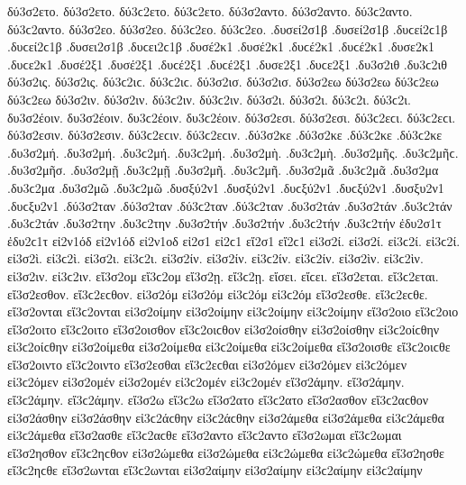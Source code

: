 {δύ3σ2ετο. δύ3σ2ετο. δύ3ϲ2ετο. δύ3ϲ2ετο.   %
δύ3σ2αντο. δύ3σ2αντο. δύ3ϲ2αντο. δύ3ϲ2αντο.   %
δύ3σ2εο. δύ3σ2εο. δύ3ϲ2εο. δύ3ϲ2εο.   %
.δυσεί2σ1β .δυσεί2σ1β .δυϲεί2ϲ1β .δυϲεί2ϲ1β   %
.δυσει2σ1β .δυϲει2ϲ1β 
.δυσέ2κ1 .δυσέ2κ1 .δυϲέ2κ1 .δυϲέ2κ1   %
.δυσε2κ1 .δυϲε2κ1 
.δυσέ2ξ1 .δυσέ2ξ1 .δυϲέ2ξ1 .δυϲέ2ξ1   %
.δυσε2ξ1 .δυϲε2ξ1 
.δυ3σ2ιθ .δυ3ϲ2ιθ   %
δύ3σ2ις. δύ3σ2ις. δύ3ϲ2ιϲ. δύ3ϲ2ιϲ.   %
δύ3σ2ισ. δύ3σ2ισ. 
δύ3σ2εω δύ3σ2εω δύ3ϲ2εω δύ3ϲ2εω 
δύ3σ2ιν. δύ3σ2ιν. δύ3ϲ2ιν. δύ3ϲ2ιν. 
δύ3σ2ι. δύ3σ2ι. δύ3ϲ2ι. δύ3ϲ2ι. 
δυ3σ2έοιν. δυ3σ2έοιν. δυ3ϲ2έοιν. δυ3ϲ2έοιν. 
δύ3σ2εσι. δύ3σ2εσι. δύ3ϲ2εϲι. δύ3ϲ2εϲι. 
δύ3σ2εσιν. δύ3σ2εσιν. δύ3ϲ2εϲιν. δύ3ϲ2εϲιν. 
.δύ3σ2κε .δύ3σ2κε .δύ3ϲ2κε .δύ3ϲ2κε   %
.δυ3σ2μή. .δυ3σ2μή. .δυ3ϲ2μή. .δυ3ϲ2μή.   %
.δυ3σ2μὴ. .δυ3ϲ2μὴ. 
.δυ3σ2μῆς. .δυ3ϲ2μῆϲ. 
.δυ3σ2μῆσ. 
.δυ3σ2μῇ .δυ3ϲ2μῇ 
.δυ3σ2μῆ. .δυ3ϲ2μῆ. 
.δυ3σ2μᾶ .δυ3ϲ2μᾶ 
.δυ3σ2μα .δυ3ϲ2μα 
.δυ3σ2μῶ .δυ3ϲ2μῶ 
.δυσξύ2ν1 .δυσξύ2ν1 .δυϲξύ2ν1 .δυϲξύ2ν1   %
.δυσξυ2ν1 .δυϲξυ2ν1 
.δύ3σ2ταν .δύ3σ2ταν .δύ3ϲ2ταν .δύ3ϲ2ταν   %
.δυ3σ2τάν .δυ3σ2τάν .δυ3ϲ2τάν .δυ3ϲ2τάν 
.δυ3σ2την .δυ3ϲ2την   %
.δυ3σ2τήν .δυ3σ2τήν .δυ3ϲ2τήν .δυ3ϲ2τήν 
ἐδυ2σ1τ ἐδυ2ϲ1τ   %
εἰ2ν1όδ εἰ2ν1όδ   %
εἰ2ν1οδ 
εἰ2σ1 εἰ2ϲ1   %
εἴ2σ1 εἴ2ϲ1 
εἰ3σ2ί. εἰ3σ2ί. εἰ3ϲ2ί. εἰ3ϲ2ί.   %
εἰ3σ2ὶ. εἰ3ϲ2ὶ. 
εἰ3σ2ι. εἰ3ϲ2ι. 
εἰ3σ2ίν. εἰ3σ2ίν. εἰ3ϲ2ίν. εἰ3ϲ2ίν. 
εἰ3σ2ὶν. εἰ3ϲ2ὶν. 
εἰ3σ2ιν. εἰ3ϲ2ιν. 
εἴ3σ2ομ εἴ3ϲ2ομ   %
εἴ3σ2ῃ. εἴ3ϲ2ῃ. εἴσει. εἴϲει. 
εἴ3σ2εται. εἴ3ϲ2εται. 
εἴ3σ2εσθον. εἴ3ϲ2εϲθον. 
εἰ3σ2όμ εἰ3σ2όμ εἰ3ϲ2όμ εἰ3ϲ2όμ   %
εἴ3σ2εσθε. εἴ3ϲ2εϲθε. 
εἴ3σ2ονται εἴ3ϲ2ονται 
%
εἰ3σ2οίμην εἰ3σ2οίμην εἰ3ϲ2οίμην εἰ3ϲ2οίμην 
εἴ3σ2οιο εἴ3ϲ2οιο 
εἴ3σ2οιτο εἴ3ϲ2οιτο 
εἴ3σ2οισθον εἴ3ϲ2οιϲθον 
εἰ3σ2οίσθην εἰ3σ2οίσθην εἰ3ϲ2οίϲθην εἰ3ϲ2οίϲθην 
εἰ3σ2οίμεθα εἰ3σ2οίμεθα εἰ3ϲ2οίμεθα εἰ3ϲ2οίμεθα 
εἴ3σ2οισθε εἴ3ϲ2οιϲθε 
εἴ3σ2οιντο εἴ3ϲ2οιντο 
%
εἴ3σ2εσθαι εἴ3ϲ2εϲθαι 
εἰ3σ2όμεν εἰ3σ2όμεν εἰ3ϲ2όμεν εἰ3ϲ2όμεν   %
εἰ3σ2ομέν εἰ3σ2ομέν εἰ3ϲ2ομέν εἰ3ϲ2ομέν 
%
εἴ3σ2άμην. εἴ3σ2άμην. εἴ3ϲ2άμην. εἴ3ϲ2άμην. 
εἴ3σ2ω εἴ3ϲ2ω 
εἴ3σ2ατο εἴ3ϲ2ατο 
εἴ3σ2ασθον εἴ3ϲ2αϲθον 
εἰ3σ2άσθην εἰ3σ2άσθην εἰ3ϲ2άϲθην εἰ3ϲ2άϲθην 
εἰ3σ2άμεθα εἰ3σ2άμεθα εἰ3ϲ2άμεθα εἰ3ϲ2άμεθα 
εἴ3σ2ασθε εἴ3ϲ2αϲθε 
εἴ3σ2αντο εἴ3ϲ2αντο 
%
εἴ3σ2ωμαι εἴ3ϲ2ωμαι 
εἴ3σ2ησθον εἴ3ϲ2ηϲθον 
εἰ3σ2ώμεθα εἰ3σ2ώμεθα εἰ3ϲ2ώμεθα εἰ3ϲ2ώμεθα 
εἴ3σ2ησθε εἴ3ϲ2ηϲθε 
εἴ3σ2ωνται εἴ3ϲ2ωνται 
%
εἰ3σ2αίμην εἰ3σ2αίμην εἰ3ϲ2αίμην εἰ3ϲ2αίμην 
}
